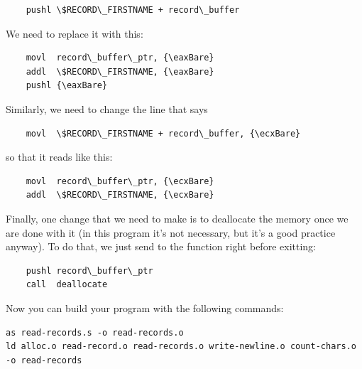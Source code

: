 \begin{simpletyping}
\begin{lstlisting}
	pushl \$RECORD\_FIRSTNAME + record\_buffer
\end{lstlisting}
\end{simpletyping}

We need to replace it with this:

\begin{simpletyping}
\begin{lstlisting}
	movl  record\_buffer\_ptr, {\eaxBare}
	addl  \$RECORD\_FIRSTNAME, {\eaxBare}
	pushl {\eaxBare}
\end{lstlisting}
\end{simpletyping}

Similarly, we need to change the line that says

\begin{simpletyping}
\begin{lstlisting}
	movl  \$RECORD\_FIRSTNAME + record\_buffer, {\ecxBare}
\end{lstlisting}
\end{simpletyping}

so that it reads like this:

\begin{simpletyping}
\begin{lstlisting}
	movl  record\_buffer\_ptr, {\ecxBare}
	addl  \$RECORD\_FIRSTNAME, {\ecxBare}
\end{lstlisting}
\end{simpletyping}

Finally, one change that we need to make is to deallocate the memory once
we are done with it (in this program it's not necessary, but it's a good 
practice anyway).  To do that, we just send 
to the  function right before exitting:

\begin{simpletyping}
\begin{lstlisting}
	pushl record\_buffer\_ptr
	call  deallocate
\end{lstlisting}
\end{simpletyping}

Now you can build your program with the following commands:

\begin{simpletyping}
\begin{lstlisting}
as read-records.s -o read-records.o
ld alloc.o read-record.o read-records.o write-newline.o count-chars.o -o read-records
\end{lstlisting}
\end{simpletyping}

